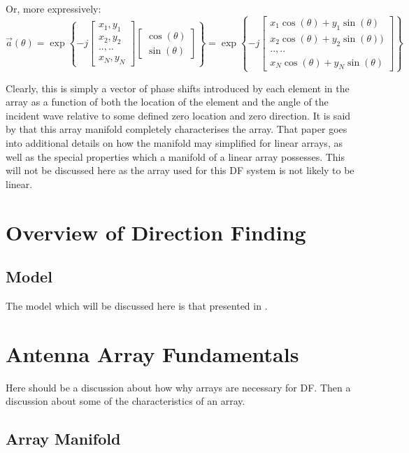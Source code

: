 Or, more expressively:
\begin{equation}
\vec{a}(\theta) = \exp \left\{ -j \begin{bmatrix} x_1, y_1 \\ x_2, y_2 \\ .., .. \\ x_N, y_N \end{bmatrix} \begin{bmatrix} \cos(\theta) \\ \sin(\theta) \end{bmatrix} \right\}
= \exp \left\{ -j \begin{bmatrix} x_1\cos(\theta) + y_1\sin(\theta) \\ x_2\cos(\theta) + y_2\sin(\theta)) \\ .., .. \\ x_N\cos(\theta) + y_N\sin(\theta) \end{bmatrix} \right\}
\end{equation}

Clearly, this is simply a vector of phase shifts introduced by each element in the array as a function of both the location of the element and the angle of the incident wave relative to some defined zero location and zero direction. It is said by \cite{dacos1995estimating} that this array manifold completely characterises the array. That paper goes into additional details on how the manifold may simplified for linear arrays, as well as the special properties which a manifold of a linear array possesses. This will not be discussed here as the array used for this DF system is not likely to be linear. 


\section{Overview of Direction Finding}

\subsection{Model}
The model which will be discussed here is that presented in \cite{poisel2012electronic}.  

\section{Antenna Array Fundamentals}
Here should be a discussion about how why arrays are necessary for DF. Then a discussion about some of the characteristics of an array.
\subsection{Array Manifold}
